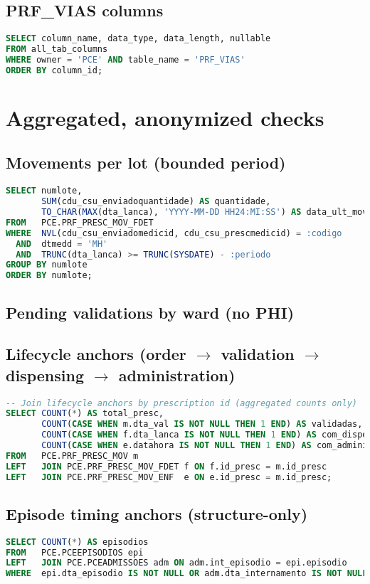 \subsection*{PRF\_VIAS columns}
\begin{lstlisting}[language=SQL]
SELECT column_name, data_type, data_length, nullable
FROM all_tab_columns
WHERE owner = 'PCE' AND table_name = 'PRF_VIAS'
ORDER BY column_id;
\end{lstlisting}

\section{Aggregated, anonymized checks}
\begingroup\small
\subsection*{Movements per lot (bounded period)}
\begin{lstlisting}[language=SQL]
SELECT numlote,
       SUM(cdu_csu_enviadoquantidade) AS quantidade,
       TO_CHAR(MAX(dta_lanca), 'YYYY-MM-DD HH24:MI:SS') AS data_ult_mov
FROM   PCE.PRF_PRESC_MOV_FDET
WHERE  NVL(cdu_csu_enviadomedicid, cdu_csu_prescmedicid) = :codigo
  AND  dtmedd = 'MH'
  AND  TRUNC(dta_lanca) >= TRUNC(SYSDATE) - :periodo
GROUP BY numlote
ORDER BY numlote;
\end{lstlisting}

\subsection*{Pending validations by ward (no PHI)}
\subsection*{Lifecycle anchors (order $\rightarrow$ validation $\rightarrow$ dispensing $\rightarrow$ administration)}
\begin{lstlisting}[language=SQL]
-- Join lifecycle anchors by prescription id (aggregated counts only)
SELECT COUNT(*) AS total_presc,
       COUNT(CASE WHEN m.dta_val IS NOT NULL THEN 1 END) AS validadas,
       COUNT(CASE WHEN f.dta_lanca IS NOT NULL THEN 1 END) AS com_dispensa,
       COUNT(CASE WHEN e.datahora IS NOT NULL THEN 1 END) AS com_administracao
FROM   PCE.PRF_PRESC_MOV m
LEFT   JOIN PCE.PRF_PRESC_MOV_FDET f ON f.id_presc = m.id_presc
LEFT   JOIN PCE.PRF_PRESC_MOV_ENF  e ON e.id_presc = m.id_presc;
\end{lstlisting}

\subsection*{Episode timing anchors (structure-only)}
\begin{lstlisting}[language=SQL]
SELECT COUNT(*) AS episodios
FROM   PCE.PCEEPISODIOS epi
LEFT   JOIN PCE.PCEADMISSOES adm ON adm.int_episodio = epi.episodio
WHERE  epi.dta_episodio IS NOT NULL OR adm.dta_internamento IS NOT NULL;
\end{lstlisting}
